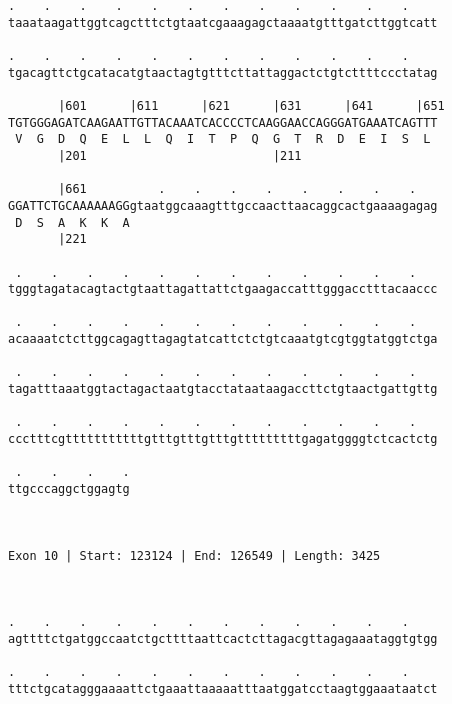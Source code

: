 \documentclass{article}
\begin{document}
\begin{Verbatim}
.    .    .    .    .    .    .    .    .    .    .    .    
taaataagattggtcagctttctgtaatcgaaagagctaaaatgtttgatcttggtcatt
                                                            
.    .    .    .    .    .    .    .    .    .    .    .    
tgacagttctgcatacatgtaactagtgtttcttattaggactctgtcttttccctatag
                                                            
       |601      |611      |621      |631      |641      |651
TGTGGGAGATCAAGAATTGTTACAAATCACCCCTCAAGGAACCAGGGATGAAATCAGTTT
 V  G  D  Q  E  L  L  Q  I  T  P  Q  G  T  R  D  E  I  S  L 
       |201                          |211                   
  
       |661          .    .    .    .    .    .    .    .   
GGATTCTGCAAAAAAGGgtaatggcaaagtttgccaacttaacaggcactgaaaagagag
 D  S  A  K  K  A                                           
       |221                                                 
  
 .    .    .    .    .    .    .    .    .    .    .    .   
tgggtagatacagtactgtaattagattattctgaagaccatttgggacctttacaaccc
                                                            
 .    .    .    .    .    .    .    .    .    .    .    .   
acaaaatctcttggcagagttagagtatcattctctgtcaaatgtcgtggtatggtctga
                                                            
 .    .    .    .    .    .    .    .    .    .    .    .   
tagatttaaatggtactagactaatgtacctataataagaccttctgtaactgattgttg
                                                            
 .    .    .    .    .    .    .    .    .    .    .    .   
ccctttcgtttttttttttgtttgtttgtttgtttttttttgagatggggtctcactctg
                                                            
 .    .    .    .
ttgcccaggctggagtg
                 
                 
 
Exon 10 | Start: 123124 | End: 126549 | Length: 3425



.    .    .    .    .    .    .    .    .    .    .    .    
agttttctgatggccaatctgcttttaattcactcttagacgttagagaaataggtgtgg
                                                            
.    .    .    .    .    .    .    .    .    .    .    .    
tttctgcatagggaaaattctgaaattaaaaatttaatggatcctaagtggaaataatct
                                                            

\end{Verbatim}
\end{document}
